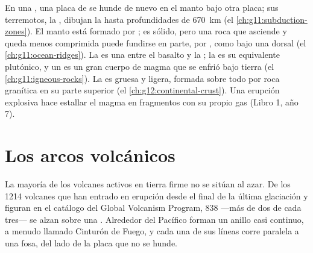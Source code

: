 \begin{recall}
En una , una placa de  se hunde de nuevo
en el manto bajo otra placa; sus terremotos, la ,
dibujan la  hasta profundidades de \qty{670}{km}
(el \cref{ch:g11:subduction-zones}). El manto está formado por ; es
sólido, pero una roca que asciende y queda menos comprimida puede fundirse en
parte, por , como bajo una dorsal (el
\cref{ch:g11:ocean-ridges}). La  es una  
entre el basalto y la ; la  es su equivalente plutónico, y un
 es un gran cuerpo de magma que se enfrió bajo tierra
(el \cref{ch:g11:igneous-rocks}). La  es gruesa y ligera,
formada sobre todo por roca granítica en su parte superior (el
\cref{ch:g12:continental-crust}). Una erupción explosiva hace estallar el
magma en fragmentos con su propio gas (Libro 1, año 7).
\end{recall}

\section{Los arcos volcánicos}

La mayoría de los volcanes activos en tierra firme no se sitúan al azar. De
los 1214 volcanes que han entrado en erupción desde el final de la última
glaciación y figuran en el catálogo del Global Volcanism Program, 838 ---más
de dos de cada tres--- se alzan sobre una . Alrededor del
Pacífico forman un anillo casi continuo, a menudo llamado Cinturón de Fuego, y
cada una de sus líneas corre paralela a una fosa, del lado de la placa que no
se hunde.

